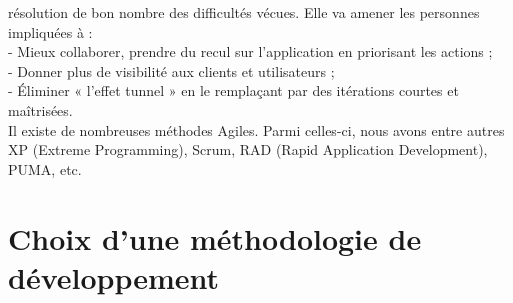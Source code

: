résolution de bon nombre des difficultés vécues. Elle va amener les personnes impliquées à : \\
- Mieux collaborer, prendre du recul sur l’application en priorisant les actions ; \\
- Donner plus de visibilité aux clients et utilisateurs ; \\
- Éliminer « l’effet tunnel »  en le remplaçant par des itérations courtes et maîtrisées.\\
Il existe de nombreuses méthodes Agiles. Parmi celles-ci, nous avons entre autres XP (Extreme Programming), Scrum, RAD (Rapid Application Development), PUMA, etc.

\section{Choix d'une méthodologie de développement}

\clearpage 